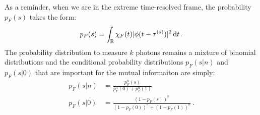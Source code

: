 \begin{remark}
As a reminder, when we are in the extreme time-resolved frame, the 
probability $p_F(s)$ takes the form:
%
\begin{align}
p_F(s) = \int_{\mathbb{R}} \chi_F(t) |\phi(t-\tau^{(s)})|^2 
\, \mathrm{d} t
\,.
\end{align}
The probability distribution to measure $k$ photons remains a mixture
of binomial distributions and the conditional probability distributions 
$p_F(s|n)$ and $p_F(s|0)$ that are important for the mutual informaiton
are simply:
%
\begin{subequations}
\begin{align}
p_F(s|n) &= \frac{p_F^n(s)}{p_F^n(0) + p_F^n(1)} \\
p_F(s|0) &= \frac{(1-p_F(s))^n}{(1-p_F(0))^n + (1-p_F(1))^n}
\,.
\end{align}
\end{subequations}
\end{remark}

